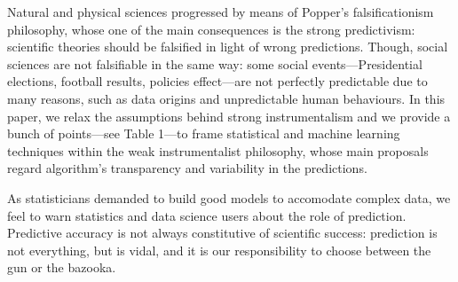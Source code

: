 \documentclass{statsoc}
\begin{document}
Natural and physical sciences progressed by means of Popper's falsificationism philosophy, whose one of the main consequences is the 
strong predictivism: scientific theories should be falsified in light of wrong predictions. Though, social sciences are not falsifiable in the 
same way: some social events---Presidential elections, football results, policies effect---are not perfectly predictable due to many reasons, such 
as data origins and unpredictable human behaviours. In this paper, we relax the assumptions behind strong instrumentalism and we provide a 
bunch of points---see Table 1---to frame statistical and machine learning techniques within the weak instrumentalist philosophy, whose main 
proposals regard algorithm's transparency and variability in the predictions.

As statisticians demanded to build good models to accomodate complex data, we feel to warn statistics and data science users about the role of prediction. Predictive accuracy is not always constitutive of scientific success: prediction is not everything, but is vidal, and it is our responsibility to choose between the gun or the bazooka.





\end{document}

